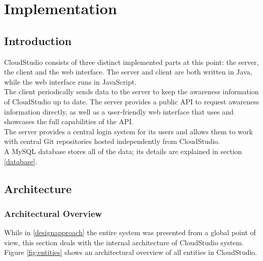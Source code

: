 

\chapter{Implementation}\label{implementation}



\section{Introduction}

CloudStudio consists of three distinct implemented parts at this point: the server, the client and the web interface. The server and client are both written in Java, while the web interface runs in JavaScript. \\

The client periodically sends data to the server to keep the awareness information of CloudStudio up to date. The server provides a public API to request awareness information directly, as well as a user-friendly web interface that uses and showcases the full capabilities of the API. \\

The server provides a central login system for its users and allows them to work with central Git repositories hosted independently from CloudStudio. \\

A MySQL database stores all of the data; its details are explained in section \ref{database}.





\section{Architecture}

\subsection{Architectural Overview}

While in \ref{designapproach} the entire system was presented from a global point of view, this section deals with the internal architecture of CloudStudio system. Figure \ref{fig:entities} shows an architectural overview of all entities in CloudStudio.

